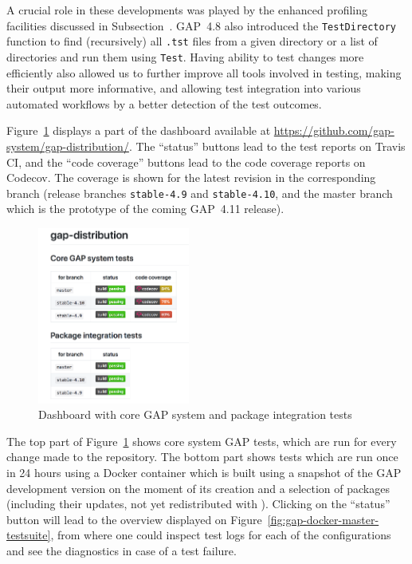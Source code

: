 \documentclass{deliverablereport}
\begin{document}
A crucial role in these developments was played by the enhanced
profiling facilities discussed 
in Subsection~\label{gap-4.8}. 
GAP~4.8 also introduced the {\tt TestDirectory} function to find
(recursively) all {\tt .tst} files from a given directory or a list of 
directories and run them using {\tt Test}. Having ability to test
changes more efficiently also allowed us to further improve all 
tools involved in testing, making their output more informative,
and allowing test integration into various automated workflows
by a better detection of the test outcomes. %

Figure~\ref{fig:gap-core-tests} displays a part of the dashboard
available at \url{https://github.com/gap-system/gap-distribution/}.
The ``status'' buttons lead to the test reports on Travis CI, and
the ``code coverage'' buttons lead to the code coverage reports on
Codecov. The coverage is shown for the latest revision in the
corresponding branch (release branches {\tt stable-4.9} and {\tt stable-4.10},
and the master branch which is the prototype of the coming GAP~4.11 release).

\begin{figure}[!ht]
    \centering
    \includegraphics[width=5cm]{images/gap-core-tests}
    \caption{Dashboard with core GAP system and package integration tests}
    \label{fig:gap-core-tests}
\end{figure}

The top part of Figure~\ref{fig:gap-core-tests} shows core system GAP tests,
which are run for every change made to the repository. The bottom part shows
tests which are run once in 24 hours using a Docker container which is built
using a snapshot of the GAP development version on the moment of its creation
and a selection of \GAP packages (including their updates, not yet redistributed
with \GAP). Clicking on the ``status'' button will lead to the overview displayed
on Figure~\ref{fig:gap-docker-master-testsuite}, from where one could inspect
test logs for each of the configurations and see the diagnostics in case of a
test failure.
\end{document}
